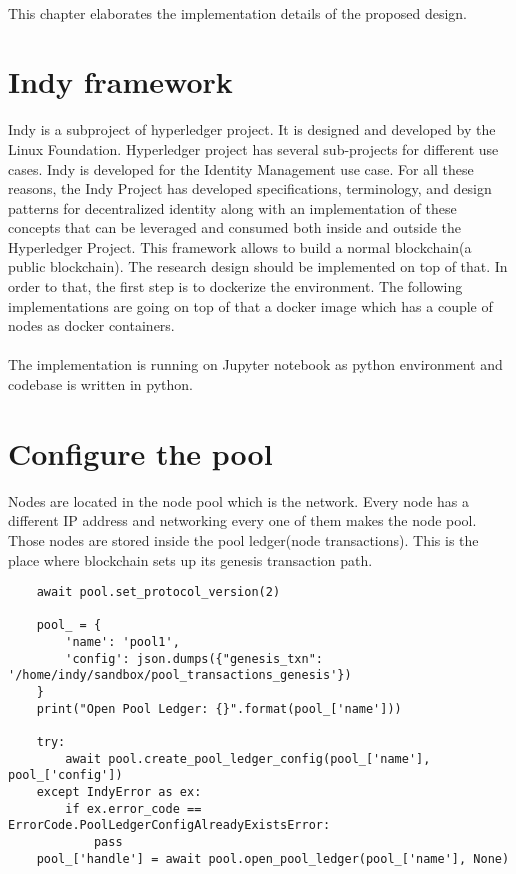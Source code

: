 \paragraph{}
This chapter elaborates the implementation details of the proposed design. 

\section{Indy framework}
Indy is a subproject of hyperledger project. It is designed and developed by the Linux Foundation. Hyperledger project has several sub-projects for different use cases. Indy is developed for the Identity Management use case. For all these reasons, the Indy Project has developed specifications, terminology, and design patterns for decentralized identity along with an implementation of these concepts that can be leveraged and consumed both inside and outside the Hyperledger Project. This framework allows to build a normal blockchain(a public blockchain). The research design should be implemented on top of that. In order to that, the first step is to dockerize the environment. The following implementations are going on top of that a docker image which has a couple of nodes as docker containers. 

\paragraph{}
The implementation is running on Jupyter notebook as python environment and codebase is written in python.

\section{Configure the pool}
Nodes are located in the node pool which is the network. Every node has a different IP address and networking every one of them makes the node pool. Those nodes are stored inside the pool ledger(node transactions). This is the place where blockchain sets up its genesis transaction path. 

\begin{verbatim}
    await pool.set_protocol_version(2)

    pool_ = {
        'name': 'pool1',
        'config': json.dumps({"genesis_txn": '/home/indy/sandbox/pool_transactions_genesis'})
    }
    print("Open Pool Ledger: {}".format(pool_['name']))

    try:
        await pool.create_pool_ledger_config(pool_['name'], pool_['config'])
    except IndyError as ex:
        if ex.error_code == ErrorCode.PoolLedgerConfigAlreadyExistsError:
            pass
    pool_['handle'] = await pool.open_pool_ledger(pool_['name'], None)

\end{verbatim}

